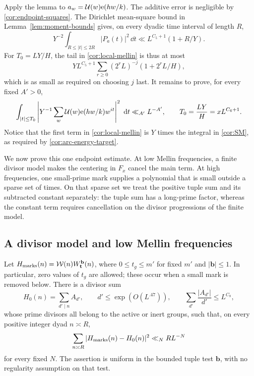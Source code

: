 Apply the lemma to $a_w=\mathcal U(w)\mathrm{e}(hw/k)$.  The additive error
is negligible by \eqref{cor:endpoint-squares}.  The Dirichlet
mean-square bound in Lemma~\ref{lem:moment-bounds} gives, on every
dyadic time interval of length $R$,
\[
 Y^{-2}\int_{R\leq|t|\leq2R}|P_a(t)|^2\,\dd t
       \ll L^{C_5+1}(1+R/Y).
\]
For $T_0=LY/H$, the tail in \eqref{cor:local-mellin} is thus at most
\[
 YL^{C_5+1}\sum_{r\geq0}(2^rL)^{-j}
                      (1+2^rL/H),
\]
which is as small as required on choosing $j$ last.  It remains to
prove, for every fixed $A'>0$,
\begin{equation}\label{cor:SM}
 \int_{|t|\leq T_0}
 \left|Y^{-1}\sum_w\mathcal U(w)\mathrm{e}(hw/k)w^{it}\right|^2\,\,\mathrm d t
       \ll_{A'} L^{-A'},
 \qquad T_0=\frac{LY}{H}=xL^{C_6+1}.
\end{equation}
Notice that the first term in \eqref{cor:local-mellin} is $Y$ times
the integral in \eqref{cor:SM}, as required by
\eqref{cor:arc-energy-target}.

We now prove this one endpoint estimate.  At low Mellin frequencies,
a finite divisor model makes the centering in $F_x$ cancel the main
term.  At high frequencies, one small-prime mark supplies a polynomial
that is small outside a sparse set of times.  On that sparse set we
treat the positive tuple sum and its subtracted constant separately:
the tuple sum has a long-prime factor, whereas the constant term
requires cancellation on the divisor progressions of the finite model.

\subsection{A divisor model and low Mellin frequencies}

\begin{lemma}\label{lem:divisor-model}
Let
$H_{\rm marks}(n)=\mathcal W(n)W_{\mathbf t}^{\mathbf b}(n)$,
where $0\leq t_g\leq m'$ for fixed $m'$ and $|\mathbf b|\leq1$.
In particular, zero values of $t_g$ are allowed; these occur when a
small mark is removed below.
There is a divisor sum
\begin{equation}\label{cor:divisor-model}
 H_0(n)=\sum_{d'\mid n}A_{d'},\qquad
 d'\leq\exp(O(L^{.47})),\qquad
 \sum_{d'}\frac{|A_{d'}|}{d'}\leq L^{C_8},
\end{equation}
whose prime divisors all belong to the active or inert groups, such
that, on every positive integer dyad $n\asymp R$,
\begin{equation}\label{cor:model-error}
 \sum_{n\asymp R}|H_{\rm marks}(n)-H_0(n)|^2
       \ll_N R L^{-N}
\end{equation}
for every fixed $N$.  The assertion is uniform in the bounded tuple
test $\mathbf b$, with no regularity assumption on that test.
\end{lemma}

